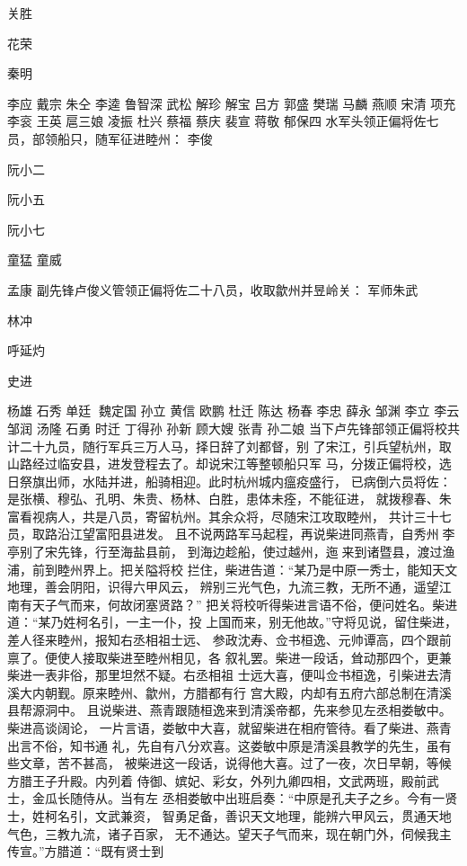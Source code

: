 关胜

花荣

秦明

李应
戴宗
朱仝
李逵
鲁智深
武松
解珍
解宝
吕方
郭盛
樊瑞
马麟
燕顺
宋清
项充
李衮
王英
扈三娘
凌振
杜兴
蔡福
蔡庆
裴宣
蒋敬
郁保四
水军头领正偏将佐七员，部领船只，随军征进睦州：
李俊

阮小二

阮小五

阮小七

童猛
童威

孟康
副先锋卢俊义管领正偏将佐二十八员，收取歙州并昱岭关：
军师朱武

林冲

呼延灼

史进

杨雄
石秀
单廷
魏定国
孙立
黄信
欧鹏
杜迁
陈达
杨春
李忠
薛永
邹渊
李立
李云
邹润
汤隆
石勇
时迁
丁得孙
孙新
顾大嫂
张青
孙二娘
当下卢先锋部领正偏将校共计二十九员，随行军兵三万人马，择日辞了刘都督，别
了宋江，引兵望杭州，取山路经过临安县，进发登程去了。却说宋江等整顿船只军
马，分拨正偏将校，选日祭旗出师，水陆并进，船骑相迎。此时杭州城内瘟疫盛行，
已病倒六员将佐：是张横、穆弘、孔明、朱贵、杨林、白胜，患体未痊，不能征进，
就拨穆春、朱富看视病人，共是八员，寄留杭州。其余众将，尽随宋江攻取睦州，
共计三十七员，取路沿江望富阳县进发。
且不说两路军马起程，再说柴进同燕青，自秀州李亭别了宋先锋，行至海盐县前，
到海边趁船，使过越州，迤来到诸暨县，渡过渔浦，前到睦州界上。把关隘将校
拦住，柴进告道：“某乃是中原一秀士，能知天文地理，善会阴阳，识得六甲风云，
辨别三光气色，九流三教，无所不通，遥望江南有天子气而来，何故闭塞贤路？”
把关将校听得柴进言语不俗，便问姓名。柴进道：“某乃姓柯名引，一主一仆，投
上国而来，别无他故。”守将见说，留住柴进，差人径来睦州，报知右丞相祖士远、
参政沈寿、佥书桓逸、元帅谭高，四个跟前禀了。便使人接取柴进至睦州相见，各
叙礼罢。柴进一段话，耸动那四个，更兼柴进一表非俗，那里坦然不疑。右丞相祖
士远大喜，便叫佥书桓逸，引柴进去清溪大内朝觐。原来睦州、歙州，方腊都有行
宫大殿，内却有五府六部总制在清溪县帮源洞中。
且说柴进、燕青跟随桓逸来到清溪帝都，先来参见左丞相娄敏中。柴进高谈阔论，
一片言语，娄敏中大喜，就留柴进在相府管待。看了柴进、燕青出言不俗，知书通
礼，先自有八分欢喜。这娄敏中原是清溪县教学的先生，虽有些文章，苦不甚高，
被柴进这一段话，说得他大喜。过了一夜，次日早朝，等候方腊王子升殿。内列着
侍御、嫔妃、彩女，外列九卿四相，文武两班，殿前武士，金瓜长随侍从。当有左
丞相娄敏中出班启奏：“中原是孔夫子之乡。今有一贤士，姓柯名引，文武兼资，
智勇足备，善识天文地理，能辨六甲风云，贯通天地气色，三教九流，诸子百家，
无不通达。望天子气而来，现在朝门外，伺候我主传宣。”方腊道：“既有贤士到
